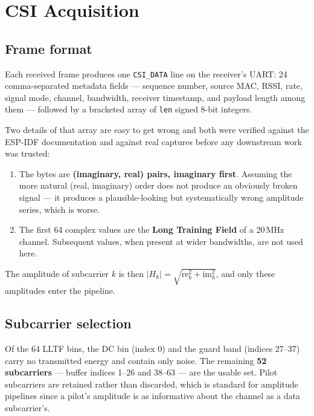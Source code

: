 \section{CSI Acquisition}
\label{sec:csi-acquisition}

\subsection{Frame format}

Each received frame produces one \texttt{CSI\_DATA} line on the receiver's
UART: 24 comma-separated metadata fields --- sequence number, source MAC,
RSSI, rate, signal mode, channel, bandwidth, receiver timestamp, and payload
length among them --- followed by a bracketed array of \texttt{len} signed
8-bit integers.

Two details of that array are easy to get wrong and both were verified
against the ESP-IDF documentation and against real captures before any
downstream work was trusted:

\begin{enumerate}
  \item The bytes are \textbf{(imaginary, real) pairs, imaginary first}.
        Assuming the more natural (real, imaginary) order does not produce
        an obviously broken signal --- it produces a plausible-looking but
        systematically wrong amplitude series, which is worse.
  \item The first 64 complex values are the \textbf{Long Training Field} of
        a 20\,MHz channel. Subsequent values, when present at wider
        bandwidths, are not used here.
\end{enumerate}

The amplitude of subcarrier $k$ is then
$|H_k| = \sqrt{\mathrm{re}_k^2 + \mathrm{im}_k^2}$, and only these
amplitudes enter the pipeline.

\subsection{Subcarrier selection}

Of the 64 LLTF bins, the DC bin (index 0) and the guard band (indices
27--37) carry no transmitted energy and contain only noise. The remaining
\textbf{52 subcarriers} --- buffer indices 1--26 and 38--63 --- are the
usable set. Pilot subcarriers are retained rather than discarded, which is
standard for amplitude pipelines since a pilot's amplitude is as informative
about the channel as a data subcarrier's.

